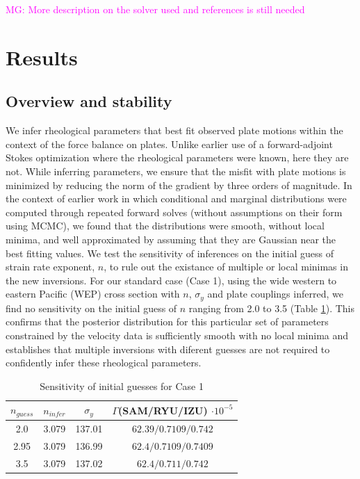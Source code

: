 \documentclass[12pt]{article}
\newcommand{\mgnote}[1]{\textcolor{magenta}{MG: #1}}
\begin{document}
{\mgnote{More description on the solver used and references is still needed}

\section{Results}

\subsection{Overview and stability}

We infer rheological parameters that best fit observed plate motions
within the context of the force balance on plates. 
Unlike earlier use of a forward-adjoint Stokes optimization \citep{ratnaswamy2015adjoint} where the rheological parameters were known, here they are not. 
While inferring parameters, we ensure that the misfit with plate motions is minimized by reducing the norm of the gradient by three orders of magnitude.
In the context of earlier work \citep{ratnaswamy2015adjoint} in which conditional and marginal distributions were computed through repeated forward solves (without assumptions on their form using MCMC), we found that the distributions were smooth, without local minima, and
well approximated by assuming that they are Gaussian
near the best fitting values.
We test the sensitivity of inferences on the initial guess of strain rate exponent, $n$, to rule out the existance of multiple or local minimas in the new inversions. 
For our standard case (Case 1), using the wide western to eastern Pacific (WEP) cross section with $n$, $\sigma_y$ and plate couplings inferred, we find no sensitivity on the initial guess of $n$ ranging from 2.0 to 3.5 (Table \ref{table:initial_guess}).
This confirms that the posterior distribution for this particular set of
parameters constrained by the velocity data is sufficiently smooth with no local minima
and establishes that multiple inversions with diferent guesses are not required to confidently infer these rheological parameters. 

\begin{table}[H]
		\caption{Sensitivity of initial guesses for Case 1} %
		\centering  %
		\begin{tabular}{ c c c c } %
		\hline \hline                        %
		 $n_{guess}$ &$n_{infer}$ &$\sigma_y$&$\Gamma $(SAM/RYU/IZU) $\cdot 10^{-5}$   \\ [0.5ex] %
		\hline                  %
        	 2.0 &3.079 & 137.01 & $62.39/0.7109/0.742$   \\
	         2.95 &3.079 & 136.99 & $62.4/0.7109/0.7409$    \\
	        3.5 &3.079 & 137.02& $62.4/0.711/0.742$  \\             
                \hline %
		\end{tabular}
		\label{table:initial_guess} %
\end{table}


}
\end{document}
